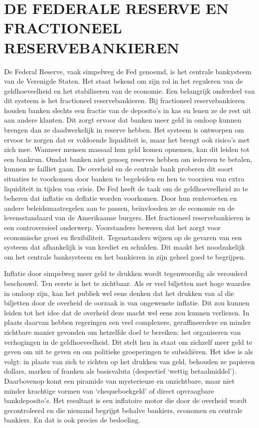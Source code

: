 \documentclass[
  a5paper,
  smalldemyvopaper,10pt,twoside,onecolumn,openright,extrafontsizes,hidelinks]{memoir}
\begin{document}
\section{DE FEDERALE RESERVE EN FRACTIONEEL
RESERVEBANKIEREN}\label{de-federale-reserve-en-fractioneel-reservebankieren}

De Federal Reserve, vaak simpelweg de Fed genoemd, is het centrale
bankysteem van de Verenigde Staten. Het staat bekend om zijn rol in het
reguleren van de geldhoeveelheid en het stabiliseren van de economie.
Een belangrijk onderdeel van dit systeem is het fractioneel
reservebankieren. Bij fractioneel reservebankieren houden banken slechts
een fractie van de deposito's in kas en lenen ze de rest uit aan andere
klanten. Dit zorgt ervoor dat banken meer geld in omloop kunnen brengen
dan ze daadwerkelijk in reserve hebben. Het systeem is ontworpen om
ervoor te zorgen dat er voldoende liquiditeit is, maar het brengt ook
risico's met zich mee. Wanneer mensen massaal hun geld komen opnemen,
kan dit leiden tot een bankrun. Omdat banken niet genoeg reserves hebben
om iedereen te betalen, kunnen ze failliet gaan. De overheid en de
centrale bank proberen dit soort situaties te voorkomen door banken te
begeleiden en hen te voorzien van extra liquiditeit in tijden van
crisis. De Fed heeft de taak om de geldhoeveelheid zo te beheren dat
inflatie en deflatie worden voorkomen. Door hun rentevoeten en andere
beleidsmaatregelen aan te passen, beïnvloeden ze de economie en de
levensstandaard van de Amerikaanse burgers. Het fractioneel
reservebankieren is een controversieel onderwerp. Voorstanders beweren
dat het zorgt voor economische groei en flexibiliteit. Tegenstanders
wijzen op de gevaren van een systeem dat afhankelijk is van krediet en
schulden. Dit maakt het noodzakelijk om het centrale banksysteem en het
bankieren in zijn geheel goed te begrijpen.

Inflatie door simpelweg meer geld te drukken wordt tegenwoordig als
verouderd beschouwd. Ten eerste is het te zichtbaar. Als er veel
biljetten met hoge waardes in omloop zijn, kan het publiek wel eens
denken dat het drukken van al die biljetten door de overheid de oorzaak
is van ongewenste inflatie. Dit zou kunnen leiden tot het idee dat de
overheid deze macht wel eens zou kunnen verliezen. In plaats daarvan
hebben regeringen een veel complexere, geraffineerdere en minder
zichtbare manier gevonden om hetzelfde doel te bereiken: het organiseren
van verhogingen in de geldhoeveelheid. Dit stelt hen in staat om
zichzelf meer geld te geven om uit te geven en om politieke groeperingen
te subsidiëren. Het idee is als volgt: in plaats van zich te richten op
het drukken van geld, behouden ze papieren dollars, marken of franken
als basisvaluta (despectief `wettig betaalmiddel'). Daarbovenop komt een
piramide van mysterieuze en onzichtbare, maar niet minder krachtige
vormen van `chequeboekgeld' of direct opvraagbare bankdeposito's. Het
resultaat is een inflatoire motor die door de overheid wordt
gecontroleerd en die niemand begrijpt behalve bankiers, economen en
centrale bankiers. En dat is ook precies de bedoeling.
\end{document}

